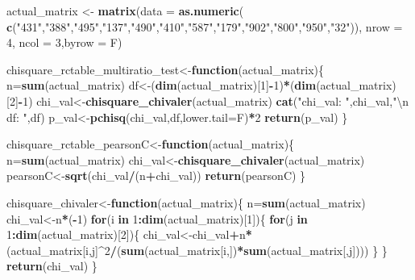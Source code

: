 \documentclass[
]{article}
\newenvironment{Shaded}{\begin{snugshade}}{\end{snugshade}}
\newcommand{\CharTok}[1]{\textcolor[rgb]{0.31,0.60,0.02}{#1}}
\newcommand{\ControlFlowTok}[1]{\textcolor[rgb]{0.13,0.29,0.53}{\textbf{#1}}}
\newcommand{\DataTypeTok}[1]{\textcolor[rgb]{0.13,0.29,0.53}{#1}}
\newcommand{\DecValTok}[1]{\textcolor[rgb]{0.00,0.00,0.81}{#1}}
\newcommand{\KeywordTok}[1]{\textcolor[rgb]{0.13,0.29,0.53}{\textbf{#1}}}
\newcommand{\NormalTok}[1]{#1}
\newcommand{\OperatorTok}[1]{\textcolor[rgb]{0.81,0.36,0.00}{\textbf{#1}}}
\newcommand{\StringTok}[1]{\textcolor[rgb]{0.31,0.60,0.02}{#1}}
\begin{document}
\begin{Shaded}
\begin{Highlighting}[]

\NormalTok{actual_matrix <-}\StringTok{ }\KeywordTok{matrix}\NormalTok{(}\DataTypeTok{data =} \KeywordTok{as.numeric}\NormalTok{( }\KeywordTok{c}\NormalTok{(}\StringTok{"431"}\NormalTok{,}\StringTok{"388"}\NormalTok{,}\StringTok{"495"}\NormalTok{,}\StringTok{"137"}\NormalTok{,}\StringTok{"490"}\NormalTok{,}\StringTok{"410"}\NormalTok{,}\StringTok{"587"}\NormalTok{,}\StringTok{"179"}\NormalTok{,}\StringTok{"902"}\NormalTok{,}\StringTok{"800"}\NormalTok{,}\StringTok{"950"}\NormalTok{,}\StringTok{"32"}\NormalTok{)), }
\DataTypeTok{nrow =} \DecValTok{4}\NormalTok{, }\DataTypeTok{ncol =} \DecValTok{3}\NormalTok{,}\DataTypeTok{byrow =}\NormalTok{ F)}

\NormalTok{chisquare_rctable_multiratio_test<-}\ControlFlowTok{function}\NormalTok{(actual_matrix)\{}
\NormalTok{     n=}\KeywordTok{sum}\NormalTok{(actual_matrix)}
\NormalTok{     df<-(}\KeywordTok{dim}\NormalTok{(actual_matrix)[}\DecValTok{1}\NormalTok{]}\OperatorTok{-}\DecValTok{1}\NormalTok{)}\OperatorTok{*}\NormalTok{(}\KeywordTok{dim}\NormalTok{(actual_matrix)[}\DecValTok{2}\NormalTok{]}\OperatorTok{-}\DecValTok{1}\NormalTok{)}
\NormalTok{     chi_val<-}\KeywordTok{chisquare_chivaler}\NormalTok{(actual_matrix)}
     \KeywordTok{cat}\NormalTok{(}\StringTok{"chi_val: "}\NormalTok{,chi_val,}\StringTok{"}\CharTok{\textbackslash{}n}\StringTok{ df: "}\NormalTok{,df)}
\NormalTok{     p_val<-}\KeywordTok{pchisq}\NormalTok{(chi_val,df,}\DataTypeTok{lower.tail=}\NormalTok{F)}\OperatorTok{*}\DecValTok{2} 
     \KeywordTok{return}\NormalTok{(p_val)}
\NormalTok{\}}

\NormalTok{chisquare_rctable_pearsonC<-}\ControlFlowTok{function}\NormalTok{(actual_matrix)\{}
\NormalTok{     n=}\KeywordTok{sum}\NormalTok{(actual_matrix)}
\NormalTok{     chi_val<-}\KeywordTok{chisquare_chivaler}\NormalTok{(actual_matrix)}
\NormalTok{     pearsonC<-}\KeywordTok{sqrt}\NormalTok{(chi_val}\OperatorTok{/}\NormalTok{(n}\OperatorTok{+}\NormalTok{chi_val))}
     \KeywordTok{return}\NormalTok{(pearsonC)}
\NormalTok{\}}

\NormalTok{chisquare_chivaler<-}\ControlFlowTok{function}\NormalTok{(actual_matrix)\{}
\NormalTok{     n=}\KeywordTok{sum}\NormalTok{(actual_matrix)}
\NormalTok{     chi_val<-n}\OperatorTok{*}\NormalTok{(}\OperatorTok{-}\DecValTok{1}\NormalTok{)}
     \ControlFlowTok{for}\NormalTok{(i }\ControlFlowTok{in} \DecValTok{1}\OperatorTok{:}\KeywordTok{dim}\NormalTok{(actual_matrix)[}\DecValTok{1}\NormalTok{])\{}
          \ControlFlowTok{for}\NormalTok{(j }\ControlFlowTok{in} \DecValTok{1}\OperatorTok{:}\KeywordTok{dim}\NormalTok{(actual_matrix)[}\DecValTok{2}\NormalTok{])\{}
\NormalTok{               chi_val<-chi_val}\OperatorTok{+}\NormalTok{n}\OperatorTok{*}\NormalTok{(actual_matrix[i,j]}\OperatorTok{^}\DecValTok{2}\OperatorTok{/}\NormalTok{(}\KeywordTok{sum}\NormalTok{(actual_matrix[i,])}\OperatorTok{*}\KeywordTok{sum}\NormalTok{(actual_matrix[,j])))}
\NormalTok{          \}}
\NormalTok{     \}}
     \KeywordTok{return}\NormalTok{(chi_val)}
\NormalTok{\}}


\end{Highlighting}
\end{Shaded}
\end{document}
